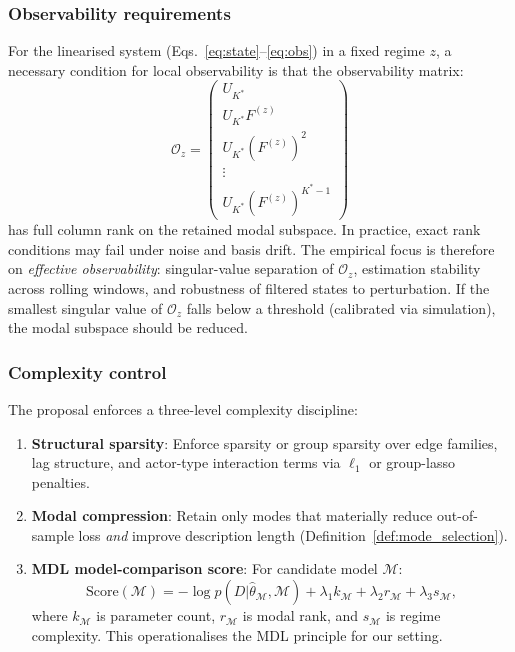 \documentclass[11pt,a4paper]{article}
\theoremstyle{definition}
\begin{document}
\subsubsection{Observability requirements}

For the linearised system (Eqs.~\ref{eq:state}--\ref{eq:obs}) in a fixed regime $z$, a necessary condition for local observability is that the observability matrix:
\begin{equation}
  \mathcal{O}_z = \begin{pmatrix} U_{K^*} \\ U_{K^*} F^{(z)} \\ U_{K^*} (F^{(z)})^2 \\ \vdots \\ U_{K^*} (F^{(z)})^{K^*-1} \end{pmatrix}
  \label{eq:observability}
\end{equation}
has full column rank on the retained modal subspace. In practice, exact rank conditions may fail under noise and basis drift. The empirical focus is therefore on \emph{effective observability}: singular-value separation of $\mathcal{O}_z$, estimation stability across rolling windows, and robustness of filtered states to perturbation. If the smallest singular value of $\mathcal{O}_z$ falls below a threshold (calibrated via simulation), the modal subspace should be reduced.

\subsubsection{Complexity control}

The proposal enforces a three-level complexity discipline:
\begin{enumerate}[nosep]
  \item \textbf{Structural sparsity}: Enforce sparsity or group sparsity over edge families, lag structure, and actor-type interaction terms via $\ell_1$ or group-lasso penalties.
  \item \textbf{Modal compression}: Retain only modes that materially reduce out-of-sample loss \emph{and} improve description length (Definition~\ref{def:mode_selection}).
  \item \textbf{MDL model-comparison score}: For candidate model $\mathcal{M}$:
  \begin{equation}
    \mathrm{Score}(\mathcal{M}) = -\log p(D|\hat{\theta}_\mathcal{M}, \mathcal{M}) + \lambda_1 k_\mathcal{M} + \lambda_2 r_\mathcal{M} + \lambda_3 s_\mathcal{M},
    \label{eq:mdl_score}
  \end{equation}
  where $k_\mathcal{M}$ is parameter count, $r_\mathcal{M}$ is modal rank, and $s_\mathcal{M}$ is regime complexity. This operationalises the MDL principle for our setting.
\end{enumerate}
\end{document}
